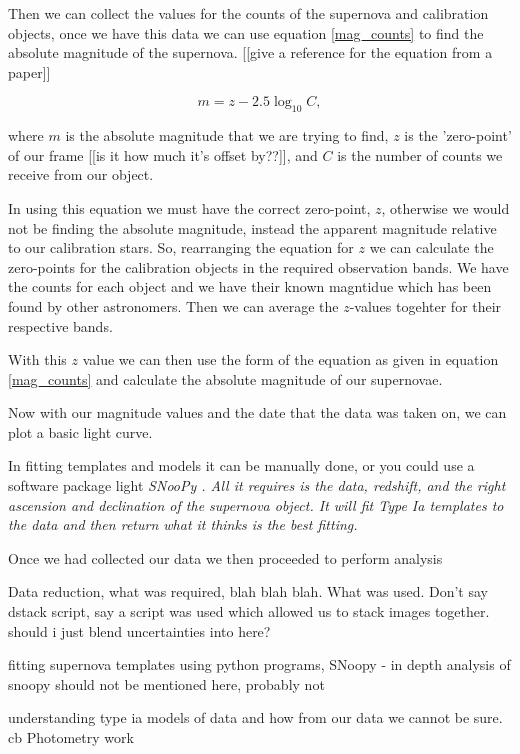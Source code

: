 \documentclass[twocolumn]{revtex4}
\begin{document}
Then we can collect the values for the counts of the supernova and calibration objects, once we have this data we can use equation \ref{mag_counts} to find the absolute magnitude of the supernova. [[give a reference for the equation from a paper]]

\begin{equation}
    m = z - 2.5 \log_{10}{C},
\label{mag_counts}
\end{equation}

where $m$ is the absolute magnitude that we are trying to find, $z$ is the 'zero-point' of our frame [[is it how much it's offset by??]], and $C$ is the number of counts we receive from our object.

In using this equation we must have the correct zero-point, $z$, otherwise we would not be finding the absolute magnitude, instead the apparent magnitude relative to our calibration stars. So, rearranging the equation for $z$ we can calculate the zero-points for the calibration objects in the required observation bands. We have the counts for each object and we have their known magntidue which has been found by other astronomers. Then we can average the $z$-values togehter for their respective bands. 

With this $z$ value we can then use the form of the equation as given in equation \ref{mag_counts} and calculate the absolute magnitude of our supernovae.

Now with our magnitude values and the date that the data was taken on, we can plot a basic light curve. 

In fitting templates and models it can be manually done, or you could use a software package light \em{SNooPy }\em. All it requires is the data, redshift, and the right ascension and declination of the supernova object. It will fit Type Ia templates to the data and then return what it thinks is the best fitting.

Once we had collected our data we then proceeded to perform analysis

Data reduction, what was required, blah blah blah. What was used. Don't say dstack script, say a script was used which allowed us to stack images together. should i just blend uncertainties into here? 

fitting supernova templates using python programs, SNoopy - in depth analysis of snoopy should not be mentioned here, probably not

understanding type ia models of data and how from our data we cannot be sure.  
 cb
Photometry work 
\end{document}

